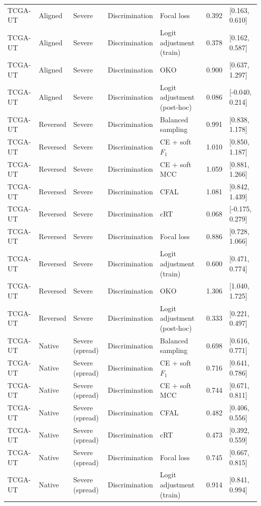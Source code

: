 \begin{longtable}{lllllll}
TCGA-UT & Aligned & Severe & Discrimination & Focal loss & 0.392 & [0.163, 0.610] \\
TCGA-UT & Aligned & Severe & Discrimination & Logit adjustment (train) & 0.378 & [0.162, 0.587] \\
TCGA-UT & Aligned & Severe & Discrimination & OKO & 0.900 & [0.637, 1.297] \\
TCGA-UT & Aligned & Severe & Discrimination & Logit adjustment (post-hoc) & 0.086 & [-0.040, 0.214] \\
TCGA-UT & Reversed & Severe & Discrimination & Balanced sampling & 0.991 & [0.838, 1.178] \\
TCGA-UT & Reversed & Severe & Discrimination & CE + soft $F_1$ & 1.010 & [0.850, 1.187] \\
TCGA-UT & Reversed & Severe & Discrimination & CE + soft MCC & 1.059 & [0.881, 1.266] \\
TCGA-UT & Reversed & Severe & Discrimination & CFAL & 1.081 & [0.842, 1.439] \\
TCGA-UT & Reversed & Severe & Discrimination & cRT & 0.068 & [-0.175, 0.279] \\
TCGA-UT & Reversed & Severe & Discrimination & Focal loss & 0.886 & [0.728, 1.066] \\
TCGA-UT & Reversed & Severe & Discrimination & Logit adjustment (train) & 0.600 & [0.471, 0.774] \\
TCGA-UT & Reversed & Severe & Discrimination & OKO & 1.306 & [1.040, 1.725] \\
TCGA-UT & Reversed & Severe & Discrimination & Logit adjustment (post-hoc) & 0.333 & [0.221, 0.497] \\
TCGA-UT & Native & Severe (spread) & Discrimination & Balanced sampling & 0.698 & [0.616, 0.771] \\
TCGA-UT & Native & Severe (spread) & Discrimination & CE + soft $F_1$ & 0.716 & [0.641, 0.786] \\
TCGA-UT & Native & Severe (spread) & Discrimination & CE + soft MCC & 0.744 & [0.671, 0.811] \\
TCGA-UT & Native & Severe (spread) & Discrimination & CFAL & 0.482 & [0.406, 0.556] \\
TCGA-UT & Native & Severe (spread) & Discrimination & cRT & 0.473 & [0.392, 0.559] \\
TCGA-UT & Native & Severe (spread) & Discrimination & Focal loss & 0.745 & [0.667, 0.815] \\
TCGA-UT & Native & Severe (spread) & Discrimination & Logit adjustment (train) & 0.914 & [0.841, 0.994] \\

\end{longtable}
